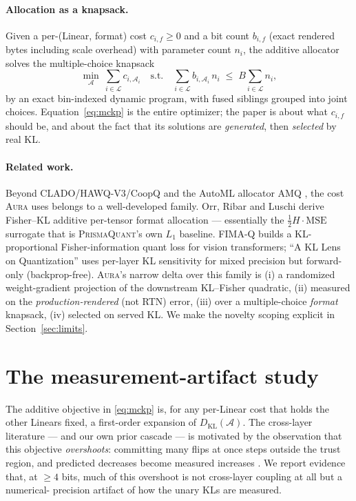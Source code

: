 \documentclass[11pt]{article}
\theoremstyle{plain}
\theoremstyle{definition}
\newcommand{\kl}{D_{\mathrm{KL}}}
\newcommand{\Linears}{\mathcal{L}}
\newcommand{\Assignment}{\mathcal{A}}
\begin{document}
\paragraph{Allocation as a knapsack.} Given a per-(Linear, format) cost
$c_{i,f}\ge 0$ and a bit count $b_{i,f}$ (exact rendered bytes including scale
overhead) with parameter count $n_i$, the additive allocator solves the
multiple-choice knapsack
\begin{equation}\label{eq:mckp}
  \min_{\Assignment}\ \sum_{i\in\Linears} c_{i,\Assignment_i}
  \quad\text{s.t.}\quad
  \sum_{i\in\Linears} b_{i,\Assignment_i}\, n_i \;\le\; B\!\sum_{i\in\Linears} n_i,
\end{equation}
by an exact bin-indexed dynamic program, with fused siblings grouped into joint
choices. Equation~\eqref{eq:mckp} is the entire optimizer; the paper is about
what $c_{i,f}$ should be, and about the fact that its solutions are
\emph{generated}, then \emph{selected} by real KL.

\paragraph{Related work.} Beyond CLADO/HAWQ-V3/CoopQ \cite{clado2023,hawqv3,coopq}
and the AutoML allocator AMQ \cite{amq}, the cost \textsc{Aura} uses belongs to a
well-developed family. Orr, Ribar and Luschi \cite{orr2025} derive Fisher--KL
additive per-tensor format allocation --- essentially the $\frac12 H\!\cdot\!
\mathrm{MSE}$ surrogate that is \textsc{PrismaQuant}'s own $L_1$ baseline.
FIMA-Q \cite{fimaq2025} builds a KL-proportional Fisher-information quant loss
for vision transformers; ``A KL Lens on Quantization'' \cite{kllens2026} uses
per-layer KL sensitivity for mixed precision but forward-only (backprop-free).
\textsc{Aura}'s narrow delta over this family is (i) a randomized
weight-gradient projection of the downstream KL--Fisher quadratic, (ii) measured
on the \emph{production-rendered} (not RTN) error, (iii) over a multiple-choice
\emph{format} knapsack, (iv) selected on served KL. We make the novelty scoping
explicit in Section~\ref{sec:limits}.

\section{The measurement-artifact study}\label{sec:additivity}

The additive objective in \eqref{eq:mckp} is, for any per-Linear cost that holds
the other Linears fixed, a first-order expansion of $\kl(\Assignment)$. The
cross-layer literature --- and our own prior cascade --- is motivated by the
observation that this objective \emph{overshoots}: committing many flips at once
steps outside the trust region, and predicted decreases become measured
increases \cite{clado2023,prismaquant}. We report evidence that, at $\ge 4$ bits,
much of this overshoot is not cross-layer coupling at all but a numerical-%
precision artifact of how the unary KLs are measured.
\end{document}
